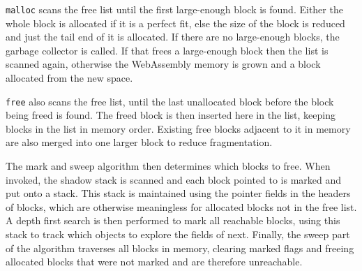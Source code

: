\verb|malloc| scans the free list until the first large-enough block is found. Either the whole block is allocated if it is a perfect fit, else the size of the block is reduced and just the tail end of it is allocated. If there are no large-enough blocks, the garbage collector is called.
If that frees a large-enough block then the list is scanned again, otherwise the WebAssembly memory is grown and a block allocated from the new space.


\verb|free| also scans the free list, until the last unallocated block before the block being freed is found. The freed block is then inserted here in the list, keeping blocks in the list in memory order. Existing free blocks adjacent to it in memory are also merged into one larger block to reduce fragmentation.

The mark and sweep algorithm then determines which blocks to free. When invoked, the shadow stack is scanned and each block pointed to is marked and put onto a stack. This stack is maintained using the pointer fields in the headers of blocks, which are otherwise meaningless for allocated blocks not in the free list. A depth first search is then performed to mark all reachable blocks, using this stack to track which objects to explore the fields of next.
Finally, the sweep part of the algorithm traverses all blocks in memory, %
clearing marked flags and freeing allocated blocks that were not marked and are therefore unreachable.

